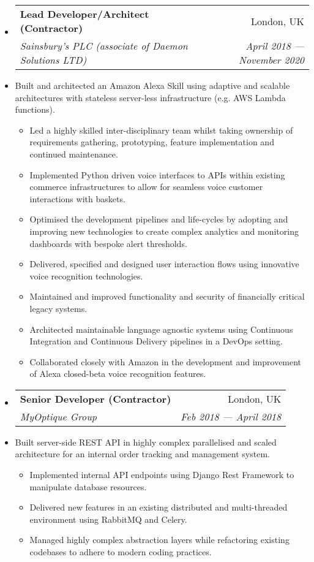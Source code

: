 \documentclass[letterpaper,11pt]{article}
\makeatletter
\newcommand{\ressubheading}[4]
    {\begin{tabular*}{180mm}{l@{\extracolsep{\fill}}r}
        \textbf{#1} & #2 \\
        \textit{#3} & \textit{#4} \\
    \end{tabular*}\vspace{-6pt}}
\newcommand{\resdescription}[1]{#1 \vspace{-0mm}}
\newcommand{\resitem}[1]{\item #1 \vspace{-2pt}}
\makeatother
\begin{document}
\begin{itemize}
        \item[]
            \ressubheading{Lead Developer/Architect (Contractor)}{London, UK}{Sainsbury's PLC (associate of Daemon Solutions LTD) }{April 2018 --- November 2020}
        \item[]
            \resdescription{Built and architected an Amazon Alexa Skill using adaptive and scalable architectures with stateless server-less infrastructure (e.g. AWS Lambda functions).}
            \begin{itemize}
                    \resitem{Led a highly skilled inter-disciplinary team whilst taking ownership of requirements gathering, prototyping, feature implementation and continued maintenance.}
                    \resitem{Implemented Python driven voice interfaces to APIs within existing commerce infrastructures to allow for seamless voice customer interactions with baskets.}
                    \resitem{Optimised the development pipelines and life-cycles by adopting and improving new technologies to create complex analytics and monitoring dashboards with bespoke alert thresholds.}
                    \resitem{Delivered, specified and designed user interaction flows using innovative voice recognition technologies.}
                    \resitem{Maintained and improved functionality and security of financially critical legacy systems.}
                    \resitem{Architected maintainable language agnostic systems using Continuous Integration and Continuous Delivery pipelines in a DevOps setting.}
                    \resitem{Collaborated closely with Amazon in the development and improvement of Alexa closed-beta voice recognition features.}
            \end{itemize}

        \item[]
            \ressubheading{Senior Developer (Contractor)}{London, UK}{MyOptique Group}{Feb 2018 --- April 2018}
        \item[]
            \resdescription{Built server-side REST API in highly complex parallelised and scaled architecture for an internal order tracking and management system.}
            \begin{itemize}
                    \resitem{Implemented internal API endpoints using Django Rest Framework to manipulate database resources.}
                    \resitem{Delivered new features in an existing distributed and multi-threaded environment using RabbitMQ and Celery.}
                    \resitem{Managed highly complex abstraction layers while refactoring existing codebases to adhere to modern coding practices.}
            \end{itemize}


\end{itemize}
\end{document}
